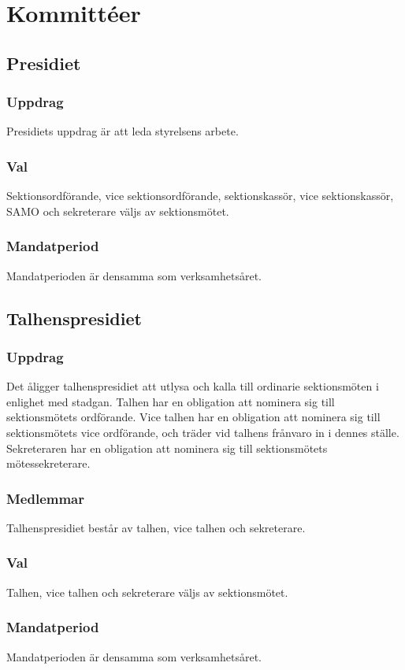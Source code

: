 \section{Kommittéer}

\subsection{Presidiet}
\subsubsection{Uppdrag}
Presidiets uppdrag är att leda styrelsens arbete.

\subsubsection{Val}
Sektionsordförande, vice sektionsordförande, sektionskassör, vice sektionskassör, SAMO och sekreterare väljs av sektionsmötet.

\subsubsection{Mandatperiod}
Mandatperioden är densamma som verksamhetsåret.

\subsection{Talhenspresidiet}
\subsubsection{Uppdrag}
Det åligger talhenspresidiet att utlysa och kalla till ordinarie sektionsmöten i enlighet med stadgan.
Talhen har en obligation att nominera sig till sektionsmötets ordförande.
Vice talhen har en obligation att nominera sig till sektionsmötets vice ordförande, och träder vid talhens frånvaro in i dennes ställe.
Sekreteraren har en obligation att nominera sig till sektionsmötets mötessekreterare.
\subsubsection{Medlemmar}
Talhenspresidiet består av talhen, vice talhen och sekreterare.
\subsubsection{Val}
Talhen, vice talhen och sekreterare väljs av sektionsmötet.
\subsubsection{Mandatperiod}
Mandatperioden är densamma som verksamhetsåret.

